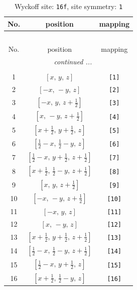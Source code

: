 \documentclass[fleqn,8pt]{jsarticle}
\begin{document}
\begin{longtable}{ccc}
\caption{Wyckoff site: {\tt 16f}, site symmetry: {\tt 1}}
 \\
 \hline \hline
No. & position & mapping \\ \hline \endfirsthead

\multicolumn{2}{l}{\tablename\ \thetable{}} \\
 \hline \hline
No. & position & mapping \\ \hline \endhead

 \hline \hline
\multicolumn{2}{r}{\footnotesize\it continued ...} \\ \endfoot

 \hline \hline
\multicolumn{2}{r}{} \\ \endlastfoot

1 & $\left[ x,\, y,\, z \right]$ & {\tt [1]} \\ \hline
2 & $\left[ - x,\, - y,\, z \right]$ & {\tt [2]} \\ \hline
3 & $\left[ - x,\, y,\, z + \frac{1}{2} \right]$ & {\tt [3]} \\ \hline
4 & $\left[ x,\, - y,\, z + \frac{1}{2} \right]$ & {\tt [4]} \\ \hline
5 & $\left[ x + \frac{1}{2},\, y + \frac{1}{2},\, z \right]$ & {\tt [5]} \\ \hline
6 & $\left[ \frac{1}{2} - x,\, \frac{1}{2} - y,\, z \right]$ & {\tt [6]} \\ \hline
7 & $\left[ \frac{1}{2} - x,\, y + \frac{1}{2},\, z + \frac{1}{2} \right]$ & {\tt [7]} \\ \hline
8 & $\left[ x + \frac{1}{2},\, \frac{1}{2} - y,\, z + \frac{1}{2} \right]$ & {\tt [8]} \\ \hline
9 & $\left[ x,\, y,\, z + \frac{1}{2} \right]$ & {\tt [9]} \\ \hline
10 & $\left[ - x,\, - y,\, z + \frac{1}{2} \right]$ & {\tt [10]} \\ \hline
11 & $\left[ - x,\, y,\, z \right]$ & {\tt [11]} \\ \hline
12 & $\left[ x,\, - y,\, z \right]$ & {\tt [12]} \\ \hline
13 & $\left[ x + \frac{1}{2},\, y + \frac{1}{2},\, z + \frac{1}{2} \right]$ & {\tt [13]} \\ \hline
14 & $\left[ \frac{1}{2} - x,\, \frac{1}{2} - y,\, z + \frac{1}{2} \right]$ & {\tt [14]} \\ \hline
15 & $\left[ \frac{1}{2} - x,\, y + \frac{1}{2},\, z \right]$ & {\tt [15]} \\ \hline
16 & $\left[ x + \frac{1}{2},\, \frac{1}{2} - y,\, z \right]$ & {\tt [16]} \\
\end{longtable}
\end{document}
